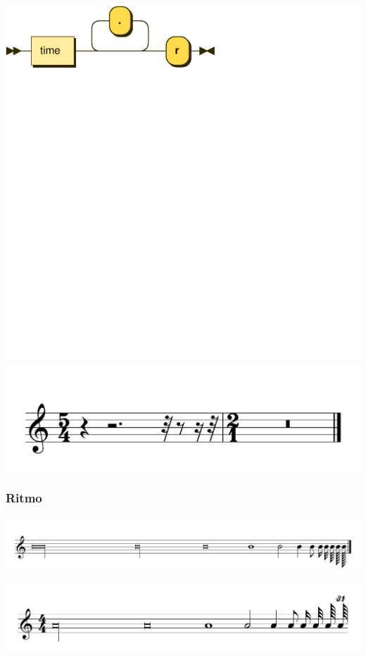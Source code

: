 \documentclass{article}
\begin{document}
\includegraphics[scale=0.5]{figures_railroad/pdf/skern/rests.pdf}
\includegraphics[scale=0.5]{figures_tests/pdf/skern/rest1.pdf}

\subsubsection{Ritmo}

\includegraphics[scale=0.3]{figures_tests/pdf/skern/rhythm.pdf}

\includegraphics[scale=0.3]{figures_tests/pdf/skern/time.pdf}
\end{document}
